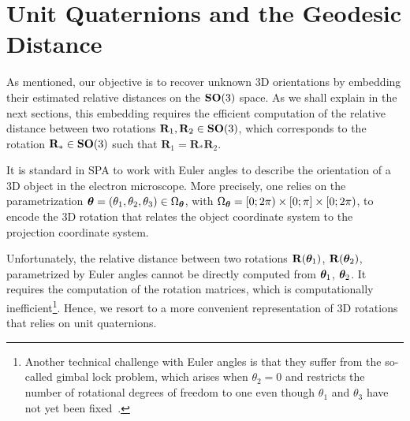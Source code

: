 \section{Unit Quaternions and the Geodesic Distance}
\label{sec:quaternions}

As mentioned, our objective is to recover unknown 3D orientations by embedding their estimated relative distances on the $\mathrm{\mathbf{SO}}(3)$ space. As we shall explain in the next sections, this embedding requires the efficient computation of the relative distance between two rotations $\mathbf{R}_1, \mathbf{R}_2 \in\mathrm{\mathbf{SO}}(3)$, which corresponds to the rotation $\mathbf{R}_*\in\mathrm{\mathbf{SO}}(3)$ such that $\mathbf{R}_1=\mathbf{R}_*\mathbf{R}_2$.

It is standard in SPA to work with Euler angles to describe the orientation of a 3D object in the electron microscope. More precisely, one relies on the parametrization ${\boldsymbol{\theta}}=(\theta_1,\theta_2,\theta_3)\in\Omega_{\boldsymbol{\theta}}$, with $\Omega_{\boldsymbol{\theta}}=[0;2\pi)\times [0;\pi] \times [0;2\pi)$, to encode the 3D rotation that relates the object coordinate system to the projection coordinate system.

Unfortunately, the relative distance between two rotations $\mathbf{R}({\boldsymbol{\theta}}_1)$, $\mathbf{R}({\boldsymbol{\theta}}_2)$, parametrized by Euler angles cannot be directly computed from ${\boldsymbol{\theta}}_1$, ${\boldsymbol{\theta}}_2$. It requires the computation of the rotation matrices, which is computationally inefficient\footnote{Another technical challenge with Euler angles is that they suffer from the so-called gimbal lock problem, which arises when $\theta_2=0$ and restricts the number of rotational degrees of freedom to one even though $\theta_1$ and $\theta_3$ have not yet been fixed~\cite{koks2006explorations}.}. Hence, we resort to a more convenient representation of 3D rotations that relies on unit quaternions.

